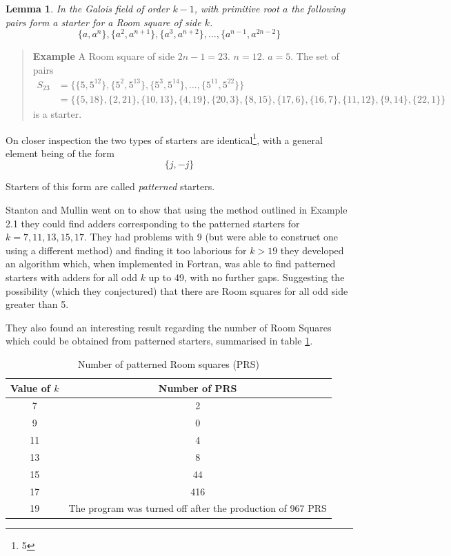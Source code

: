 \documentclass[
  11pt,
  a4paper]{book}
\newtheorem{lemma}[theorem]{Lemma}
\newcounter{examplecounter}
\begin{document}
\begin{lemma}
In the Galois field of order $k - 1$, with primitive root
$a$ the following pairs form a starter for a Room square of
side $k$.
\begin{equation}
  \{a, a^n\}, \{a^2, a^{n + 1}\}, \{a^3, a^{n + 2}\}, \ldots, \{a^{n - 1}, a^{2n - 2}\}
\end{equation}
\end{lemma}

\begin{quote}  \textbf{Example } \quad 
A Room square of side $2n - 1 = 23$. $n = 12$. $a = 5$.
The set of pairs
\begin{equation*}
\begin{split}
S_{23} &= \{\{5, 5^{12}\}, \{5^2, 5^{13}\}, \{5^3, 5^{14}\}, \ldots, \{5^{11}, 5^{22}\}\} \\
       &= \{\{5, 18\}, \{2, 21\}, \{10, 13\}, \{4, 19\}, \{20, 3\}, \{8, 15\}, \{17, 6\}, \{16, 7\}, \{11, 12\}, \{9, 14\}, \{22, 1\}\}
\end{split}
\end{equation*}
is a starter.
 \end{quote}

On closer inspection the two types of starters are
identical\footnote{5}, with a general element being of the form
\[\{j,-j\}\]

Starters of this form are called \emph{patterned} starters.

Stanton and Mullin went on to show that using the method
outlined in Example 2.1 they could find adders corresponding
to the patterned starters for \(k = 7, 11, 13, 15, 17\). They had
problems with 9 (but were able to construct one using a
different method) and finding it too laborious for \(k > 19\)
they developed an algorithm which, when implemented in
Fortran, was able to find patterned starters with adders for
all odd \(k\) up to 49, with no further gaps. Suggesting the
possibility (which they conjectured) that there are Room
squares for all odd side greater than 5.

They also found an interesting result regarding the number
of Room Squares which could be obtained from patterned
starters, summarised in table \ref{tab:patterned}.

\begin{table}[h!]
  \begin{center}
    \caption{Number of patterned Room squares (PRS)}
    \label{tab:patterned}
    \begin{tabular}{c|c}
    Value of $k$ & Number of PRS \\ \hline
    7 & 2 \\
    9 & 0 \\
    11 & 4 \\
    13 & 8 \\
    15 & 44 \\
    17 & 416 \\
    19 & The program was turned off after the production of 967 PRS
    \end{tabular}
  \end{center}
\end{table}
\end{document}
